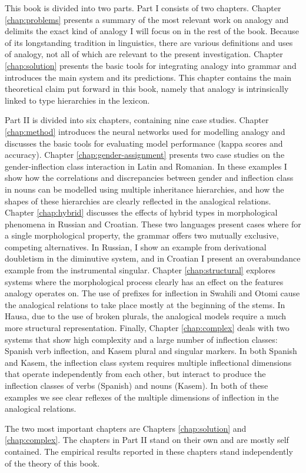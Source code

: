 This book is divided into two parts. Part I consists of two chapters. Chapter \ref{chap:problems} presents a summary of the most relevant work on analogy and delimits the exact kind of analogy I will focus on in the rest of the book. Because of its longstanding tradition in linguistics, there are various definitions and uses of analogy, not all of which are relevant to the present investigation. Chapter \ref{chap:solution} presents the basic tools for integrating analogy into grammar and introduces the main system and its predictions. This chapter contains the main theoretical claim put forward in this book, namely that analogy is intrinsically linked to type hierarchies in the lexicon.

Part II is divided into six chapters, containing nine case studies.
Chapter \ref{chap:method} introduces the neural networks used for modelling analogy and discusses the basic tools for evaluating model performance (kappa scores and accuracy).
Chapter \ref{chap:gender-assignment} presents two case studies on the gender-inflection class interaction in Latin and Romanian. In these examples I show how the correlations and discrepancies between gender and inflection class in nouns can be modelled using multiple inheritance hierarchies, and how the shapes of these hierarchies are clearly reflected in the analogical relations.
Chapter \ref{chap:hybrid} discusses the effects of hybrid types in morphological phenomena in Russian and Croatian. These two languages present cases where for a single morphological property, the grammar offers two mutually exclusive, competing alternatives. In Russian, I show an example from derivational doubletism in the diminutive system, and in Croatian I present an overabundance example from the instrumental singular.
Chapter \ref{chap:structural} explores systems where the morphological process clearly has an effect on the features analogy operates on.
The use of prefixes for inflection in Swahili and Otomi cause the analogical relations to take place mostly at the beginning of the stems.
In Hausa, due to the use of broken plurals, the analogical models require a much more structural representation.
Finally, Chapter \ref{chap:complex} deals with two systems that show high complexity and a large number of inflection classes: Spanish verb inflection, and Kasem plural and singular markers.
In both Spanish and Kasem, the inflection class system requires multiple inflectional dimensions that operate independently from each other, but interact to produce the inflection classes of verbs (Spanish) and nouns (Kasem).
In both of these examples we see clear reflexes of the multiple dimensions of inflection in the analogical relations.

The two most important chapters are Chapters \ref{chap:solution} and \ref{chap:complex}. The chapters in Part II stand on their own and are mostly self contained. The empirical results reported in these chapters stand independently of the theory of this book.

